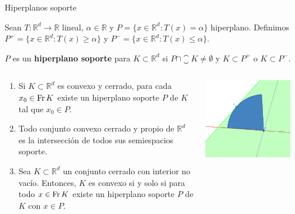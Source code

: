 \documentclass[10pt, compress]{beamer}
\newcommand\R{\mathbb{R}}
\begin{document}
\begin{frame}{Hiperplanos soporte}
  \begin{definition}
    Sean $T \colon \R^d \to \R$ lineal, $\alpha \in \R$ y $P = \{x \in \R^d \colon T(x) = \alpha \}$ hiperplano. Definimos $P^+ = \{x \in \R^d \colon T(x) \ge \alpha \}$ y $P^- = \{x \in \R^d \colon T(x) \le \alpha \}$.

    $P$ es un \textbf{hiperplano soporte} para $K \subset \R^d$ si $P \cap \closure{K} \ne \emptyset$ y $K \subset P^+$ o $K \subset P^-$.
  \end{definition}

  \begin{columns}
    \begin{theorem}
      \begin{enumerate}
        \item Si $K \subset \R^d$ es convexo y cerrado, para cada $x_0 \in \operatorname{Fr} K$ existe un hiperplano soporte $P$ de $K$ tal que $x_0 \in P$.
        \item Todo conjunto convexo cerrado y propio de $\R^d$ es la intersección de todos sus semiespacios soporte.
        \item Sea $K \subset \R^d$ un conjunto cerrado con interior no vacío. Entonces, $K$ es convexo si y solo si para todo $x \in \operatorname{Fr} K$ existe un hiperplano soporte $P$ de $K$ con $x \in P$.
      \end{enumerate}
    \end{theorem}

    \includegraphics[width=0.9\textwidth]{images/supporting_hyperplane.png}
  \end{columns}
\end{frame}
\end{document}
